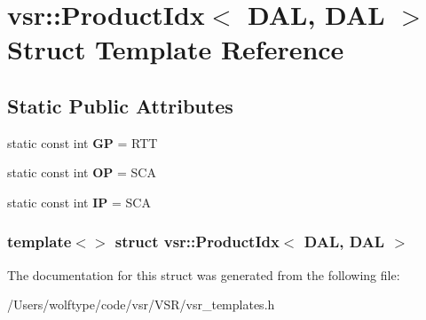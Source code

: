 \hypertarget{structvsr_1_1_product_idx_3_01_d_a_l_00_01_d_a_l_01_4}{\section{vsr\-:\-:Product\-Idx$<$ D\-A\-L, D\-A\-L $>$ Struct Template Reference}
\label{structvsr_1_1_product_idx_3_01_d_a_l_00_01_d_a_l_01_4}
}
\subsection*{Static Public Attributes}
\begin{DoxyCompactItemize}
\item 
\hypertarget{structvsr_1_1_product_idx_3_01_d_a_l_00_01_d_a_l_01_4_a05ca4fb93e87ce1604938b2294f9678c}{static const int {\bfseries G\-P} = R\-T\-T}\label{structvsr_1_1_product_idx_3_01_d_a_l_00_01_d_a_l_01_4_a05ca4fb93e87ce1604938b2294f9678c}

\item 
\hypertarget{structvsr_1_1_product_idx_3_01_d_a_l_00_01_d_a_l_01_4_adc26f9e6a2912bb96f7cef43ed74102d}{static const int {\bfseries O\-P} = S\-C\-A}\label{structvsr_1_1_product_idx_3_01_d_a_l_00_01_d_a_l_01_4_adc26f9e6a2912bb96f7cef43ed74102d}

\item 
\hypertarget{structvsr_1_1_product_idx_3_01_d_a_l_00_01_d_a_l_01_4_abfba580e81745c1325ec1041e6680c61}{static const int {\bfseries I\-P} = S\-C\-A}\label{structvsr_1_1_product_idx_3_01_d_a_l_00_01_d_a_l_01_4_abfba580e81745c1325ec1041e6680c61}

\end{DoxyCompactItemize}
\subsubsection*{template$<$$>$ struct vsr\-::\-Product\-Idx$<$ D\-A\-L, D\-A\-L $>$}



The documentation for this struct was generated from the following file\-:\begin{DoxyCompactItemize}
\item 
/\-Users/wolftype/code/vsr/\-V\-S\-R/vsr\-\_\-templates.\-h\end{DoxyCompactItemize}

